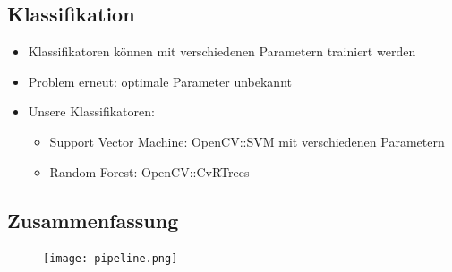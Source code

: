 \documentclass{beamer}
\begin{document}
\subsection{Klassifikation}
\begin{frame}
  \begin{itemize}
    \item Klassifikatoren können mit verschiedenen Parametern trainiert werden
    \item Problem erneut: optimale Parameter unbekannt
    \item Unsere Klassifikatoren:
      \begin{itemize}
        \item Support Vector Machine: OpenCV::SVM mit verschiedenen Parametern
        \item Random Forest: OpenCV::CvRTrees
      \end{itemize}
  \end{itemize}
\end{frame}


\subsection{Zusammenfassung}
\begin{frame}[plain]
  \begin{figure}
    \texttt{[image: pipeline.png]}
  \end{figure}
\end{frame}
\end{document}
